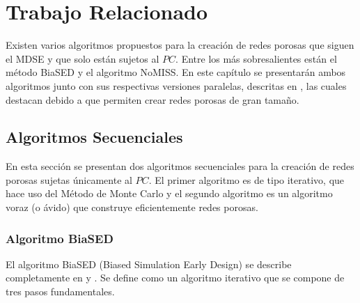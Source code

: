 \chapter{Trabajo Relacionado}
\label{champ:relatedwork}
\bigskip
\barra
\bigskip

Existen varios algoritmos propuestos para la creación de redes porosas que siguen el MDSE y que solo están sujetos al $PC$. Entre 
los más sobresalientes están el método BiaSED\cite{ref1} y el algoritmo NoMISS\cite{ref3}. En este capítulo se presentarán
ambos algoritmos junto con sus respectivas versiones paralelas, descritas en \cite{ref4}, las cuales destacan 
debido a que permiten crear redes porosas de gran tamaño.\\

\section{Algoritmos Secuenciales}
\label{subsec:seqversions}
En esta sección se presentan dos algoritmos secuenciales para la creación de redes porosas sujetas únicamente al $PC$. El primer
algoritmo es de tipo iterativo, que hace uso del Método de Monte Carlo \cite{ref15} y el segundo algoritmo es un algoritmo voraz (o ávido)
que construye eficientemente redes porosas.\\

\subsection{Algoritmo BiaSED}
\label{subsubsec:biased}
El algoritmo BiaSED (Biased Simulation Early Design) se describe completamente en \cite{ref1} y \cite{ref4}. Se define como un 
algoritmo iterativo que se compone de tres pasos fundamentales. 


